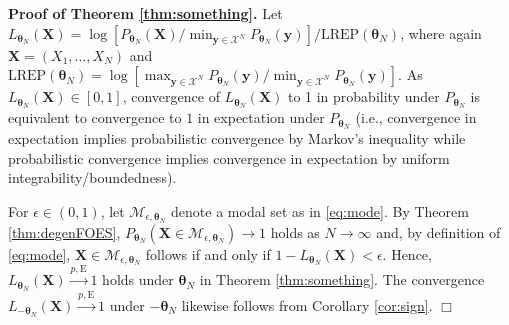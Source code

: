 \documentclass[numbib]{imamat}
\theoremstyle{theorem}
\theoremstyle{lemma}
\theoremstyle{example}
\theoremstyle{corollary}
\theoremstyle{definition}
\theoremstyle{remark}
\theoremstyle{approximation}
\theoremstyle{scheme}
\newcommand{\REP}{\mathrm{LREP}}
\begin{document}
\textbf{Proof of Theorem \ref{thm:something}.} Let
\(L_{\boldsymbol \theta_{N}}(\boldsymbol X) = \log[ P_{\boldsymbol \theta_{N}}(\boldsymbol X)/ \min_{\boldsymbol y \in \mathcal{X}^N} P_{\boldsymbol \theta_{N}}(\boldsymbol y) ]/\REP(\boldsymbol \theta_{N})\),
where again \(\boldsymbol X=(X_1, \dots, X_N)\) and
\(\REP(\boldsymbol \theta_{N})= \log[\max_{\boldsymbol y \in \mathcal{X}^N} P_{\boldsymbol \theta_{N}}(\boldsymbol y)/ \min_{\boldsymbol y \in \mathcal{X}^N} P_{\boldsymbol \theta_{N}}(\boldsymbol y) ]\).
As \(L_{\boldsymbol \theta_{N}}(\boldsymbol X)\in[0,1]\), convergence of
\(L_{\boldsymbol \theta_{N}}(\boldsymbol X)\) to 1 in probability under
\(P_{\boldsymbol \theta_{N}}\) is equivalent to convergence to \(1\) in
expectation under \(P_{\boldsymbol \theta_{N}}\) (i.e., convergence in
expectation implies probabilistic convergence by Markov's inequality
while probabilistic convergence implies convergence in expectation by
uniform integrability/boundedness).

For \(\epsilon \in(0,1)\), let
\(\mathcal{M}_{\epsilon, \boldsymbol \theta_N}\) denote a modal set as
in \eqref{eq:mode}. By Theorem \ref{thm:degenFOES},
\(P_{\boldsymbol \theta_N}\left( \boldsymbol X\in \mathcal{M}_{\epsilon, \boldsymbol \theta_N}\right) \rightarrow 1\)
holds as \(N \rightarrow \infty\) and, by definition of \eqref{eq:mode},
\(\boldsymbol X\in \mathcal{M}_{\epsilon, \boldsymbol \theta_N}\)
follows if and only if
\(1-L_{\boldsymbol \theta_{N}}(\boldsymbol X)<\epsilon\). Hence,
\(L_{\boldsymbol \theta_{N}}(\boldsymbol X) \stackrel{p,\mathrm{E}}{\longrightarrow} 1\)
holds under \(\boldsymbol \theta_{N}\) in Theorem \ref{thm:something}.
The convergence
\(L_{-\boldsymbol \theta_{N}}(\boldsymbol X) \stackrel{p,\mathrm{E}}{\longrightarrow} 1\)
under \(-\boldsymbol \theta_{N}\) likewise follows from Corollary
\ref{cor:sign}. \hfill \(\Box\)

\clearpage




\end{document}

